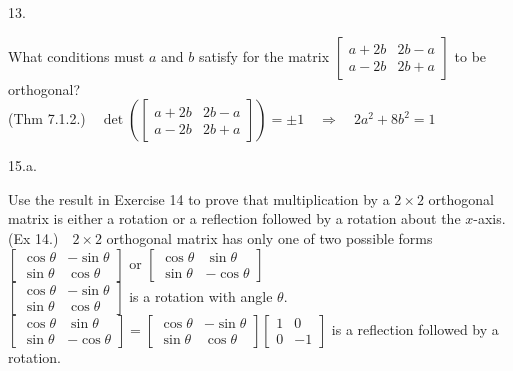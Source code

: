 \documentclass[12pt]{book}
\begin{document}
\begin{CJK}{UTF8}{bsmi}
13. \begin{minipage}[t]{\dimexpr\linewidth}
What conditions must $a$ and $b$ satisfy for the matrix $\begin{bmatrix}
a+2b & 2b-a \\
a-2b & 2b+a
\end{bmatrix}$ to be orthogonal? \\
(Thm 7.1.2.)$\quad\det\left(\begin{bmatrix}
a+2b & 2b-a \\
a-2b & 2b+a
\end{bmatrix}\right)=\pm1\quad\Rightarrow\quad2a^2+8b^2=1$
\end{minipage}

15.a. \begin{minipage}[t]{\dimexpr\linewidth-2em}
Use the result in Exercise 14 to prove that multiplication by a $2\times2$ orthogonal matrix is either a rotation or a reflection followed by a rotation about the $x$-axis. \\
(Ex 14.)$\quad2\times2$ orthogonal matrix has only one of two possible forms $\begin{bmatrix}
\cos\theta & -\sin\theta \\
\sin\theta & \cos\theta
\end{bmatrix}$ or $\begin{bmatrix}
\cos\theta & \sin\theta \\
\sin\theta & -\cos\theta
\end{bmatrix}$ \\
$\begin{bmatrix}
\cos\theta & -\sin\theta \\
\sin\theta & \cos\theta
\end{bmatrix}$ is a rotation with angle $\theta$. \\
$\begin{bmatrix}
\cos\theta & \sin\theta \\
\sin\theta & -\cos\theta
\end{bmatrix}=\begin{bmatrix}
\cos\theta & -\sin\theta \\
\sin\theta & \cos\theta
\end{bmatrix}\begin{bmatrix}
1 & 0 \\
0 & -1
\end{bmatrix}$ is a reflection followed by a rotation.
\end{minipage}


\end{CJK}
\end{document}

